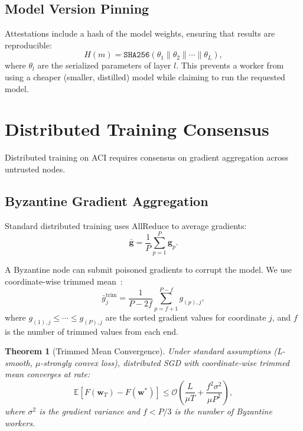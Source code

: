 \documentclass[11pt]{article}
\newtheorem{theorem}{Theorem}
\begin{document}
\subsection{Model Version Pinning}

Attestations include a hash of the model weights, ensuring that results are
reproducible:
\begin{equation}
H(m) = \texttt{SHA256}(\theta_1 \| \theta_2 \| \cdots \| \theta_L),
\end{equation}
where $\theta_l$ are the serialized parameters of layer $l$. This prevents a
worker from using a cheaper (smaller, distilled) model while claiming to run
the requested model.

\section{Distributed Training Consensus}
\label{sec:training}

Distributed training on ACI requires consensus on gradient aggregation across
untrusted nodes.

\subsection{Byzantine Gradient Aggregation}

Standard distributed training uses AllReduce to average gradients:
\begin{equation}
\bar{\mathbf{g}} = \frac{1}{P} \sum_{p=1}^{P} \mathbf{g}_p.
\end{equation}

A Byzantine node can submit poisoned gradients to corrupt the model. We use
coordinate-wise trimmed mean~\cite{byzmean}:
\begin{equation}
\bar{g}_j^{\text{trim}} = \frac{1}{P - 2f}
\sum_{p=f+1}^{P-f} g_{(p),j},
\end{equation}
where $g_{(1),j} \leq \cdots \leq g_{(P),j}$ are the sorted gradient values
for coordinate $j$, and $f$ is the number of trimmed values from each end.

\begin{theorem}[Trimmed Mean Convergence]
Under standard assumptions (L-smooth, $\mu$-strongly convex loss), distributed
SGD with coordinate-wise trimmed mean converges at rate:
\begin{equation}
\mathbb{E}[F(\mathbf{w}_T) - F(\mathbf{w}^*)] \leq
\mathcal{O}\!\left(\frac{L}{\mu T} + \frac{f^2 \sigma^2}{\mu P^2}\right),
\end{equation}
where $\sigma^2$ is the gradient variance and $f < P/3$ is the number of
Byzantine workers.
\end{theorem}
\end{document}
